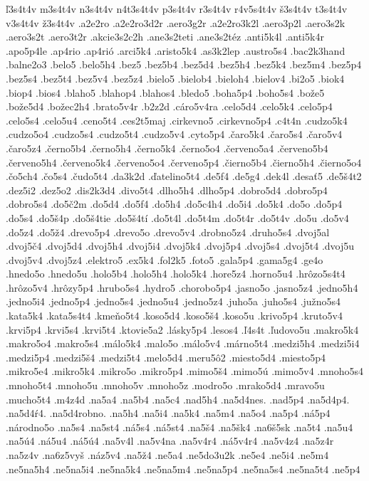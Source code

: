 {ľ3s4t4v
m3s4t4v
n3s4t4v
n4t3s4t4v
p3s4t4v
r3s4t4v
r4v5s4t4v
š3s4t4v
t3s4t4v
v3s4t4v
ž3s4t4v
.a2e2ro
.a2e2ro3d2r
.aero3g2r
.a2e2ro3k2l
.aero3p2l
.aero3s2k
.aero3s2t
.aero3t2r
.akcie3s2c2h
.ane3s2teti
.ane3s2téz
.anti5k4l
.anti5k4r
.apo5p4le
.ap4rio
.ap4rió
.arci5k4
.aristo5k4
.as3k2lep
.austro5s4
.bac2k3hand
.balne2o3
.belo5
.belo5h4
.bez5
.bez5b4
.bez5d4
.bez5h4
.bez5k4
.bez5m4
.bez5p4
.bez5s4
.bez5t4
.bez5v4
.bez5z4
.bielo5
.bielob4
.bieloh4
.bielov4
.bi2o5
.biok4
.biop4
.bios4
.blaho5
.blahop4
.blahos4
.bledo5
.boha5p4
.boho5s4
.bože5
.bože5d4
.božec2h4
.brato5v4r
.b2z2d
.cáro5v4ra
.celo5d4
.celo5k4
.celo5p4
.celo5s4
.celo5u4
.ceno5t4
.ces2t5maj
.cirkevno5
.cirkevno5p4
.c4t4n
.cudzo5k4
.cudzo5o4
.cudzo5s4
.cudzo5t4
.cudzo5v4
.cyto5p4
.čaro5k4
.čaro5s4
.čaro5v4
.čaro5z4
.černo5b4
.černo5h4
.černo5k4
.černo5o4
.červeno5a4
.červeno5b4
.červeno5h4
.červeno5k4
.červeno5o4
.červeno5p4
.čierno5b4
.čierno5h4
.čierno5o4
.čo5ch4
.čo5s4
.čudo5t4
.da3k2d
.ďatelino5t4
.de5f4
.de5g4
.dek4l
.desať5
.de5š4t2
.dez5i2
.dez5o2
.dis2k3d4
.divo5t4
.dlho5h4
.dlho5p4
.dobro5d4
.dobro5p4
.dobro5s4
.do5č2m
.do5d4
.do5f4
.do5h4
.do5c4h4
.do5i4
.do5k4
.do5o
.do5p4
.do5s4
.do5š4p
.do5š4tie
.do5š4tí
.do5t4l
.do5t4m
.do5t4r
.do5t4v
.do5u
.do5v4
.do5z4
.do5ž4
.drevo5p4
.drevo5o
.drevo5v4
.drobno5z4
.druho5s4
.dvoj5al
.dvoj5č4
.dvoj5d4
.dvoj5h4
.dvoj5i4
.dvoj5k4
.dvoj5p4
.dvoj5s4
.dvoj5t4
.dvoj5u
.dvoj5v4
.dvoj5z4
.elektro5
.ex5k4
.fol2k5
.foto5
.gala5p4
.gama5g4
.ge4o
.hnedo5o
.hnedo5u
.holo5b4
.holo5h4
.holo5k4
.hore5z4
.horno5u4
.hrôzo5s4t4
.hrôzo5v4
.hrôzy5p4
.hrubo5s4
.hydro5
.chorobo5p4
.jasno5o
.jasno5z4
.jedno5h4
.jedno5i4
.jedno5p4
.jedno5s4
.jedno5u4
.jedno5z4
.juho5a
.juho5s4
.južno5s4
.kata5k4
.kata5s4t4
.kmeňo5t4
.koso5d4
.koso5š4
.koso5u
.krivo5p4
.kruto5v4
.krvi5p4
.krvi5s4
.krvi5t4
.ktovie5a2
.lásky5p4
.lesos4
.ľ4s4t
.ľudovo5u
.makro5k4
.makro5o4
.makro5s4
.málo5k4
.malo5o
.málo5v4
.márno5t4
.medzi5h4
.medzi5i4
.medzi5p4
.medzi5š4
.medzi5t4
.melo5d4
.meru5ô2
.miesto5d4
.miesto5p4
.mikro5e4
.mikro5k4
.mikro5o
.mikro5p4
.mimo5š4
.mimo5ú
.mimo5v4
.mnoho5s4
.mnoho5t4
.mnoho5u
.mnoho5v
.mnoho5z
.modro5o
.mrako5d4
.mravo5u
.mucho5t4
.m4z4d
.na5a4
.na5b4
.na5c4
.nad5h4
.na5d4nes.
.nad5p4
.na5d4p4.
.na5d4ŕ4.
.na5d4robno.
.na5h4
.na5i4
.na5k4
.na5m4
.na5o4
.na5p4
.ná5p4
.národno5o
.na5s4
.na5st4
.ná5s4
.ná5st4
.na5š4
.na5šk4
.na6š5sk
.na5t4
.na5u4
.na5ú4
.ná5u4
.ná5ú4
.na5v4l
.na5v4na
.na5v4r4
.ná5v4r4
.na5v4z4
.na5z4r
.na5z4v
.na6z5vyš
.náz5v4
.na5ž4
.ne5a4
.ne5do3u2k
.ne5e4
.ne5i4
.ne5m4
.ne5na5h4
.ne5na5i4
.ne5na5k4
.ne5na5m4
.ne5na5p4
.ne5na5s4
.ne5na5t4
.ne5p4
}
